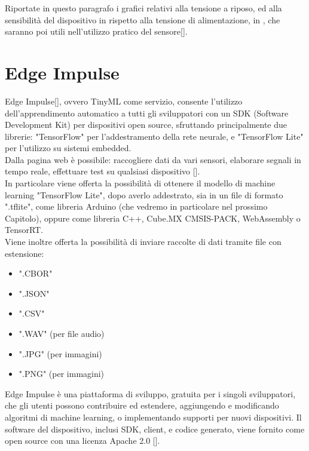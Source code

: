 Riportate in questo paragrafo i grafici relativi alla tensione a riposo, ed alla sensibilità del dispositivo in rispetto alla tensione di alimentazione, in , che saranno poi utili nell'utilizzo pratico del sensore[].

\newpage{}

\section{Edge Impulse}\label{sezione 1-4}
Edge Impulse[], ovvero TinyML come servizio, consente l'utilizzo dell'apprendimento automatico a tutti gli sviluppatori con un SDK (Software Development Kit) per dispositivi open source, sfruttando principalmente due librerie: "TensorFlow" per l'addestramento della rete neurale, e "TensorFlow Lite" per l'utilizzo su sistemi embedded.\\

Dalla pagina web è possibile: raccogliere dati da vari sensori, elaborare segnali in tempo reale, effettuare test su qualsiasi dispositivo [].\\
In particolare viene offerta la possibilità di ottenere il modello di machine learning "TensorFlow Lite", dopo averlo addestrato, sia in un file di formato ".tflite", come libreria Arduino (che vedremo in particolare nel prossimo Capitolo), oppure come libreria C++, Cube.MX CMSIS-PACK, WebAssembly o TensorRT.\\

Viene inoltre offerta la possibilità di inviare raccolte di dati tramite file con estensione:
\begin{itemize}[noitemsep]
    \item{".CBOR"}
    \item{".JSON"}
    \item{".CSV"}
    \item{".WAV" (per file audio)}
    \item{".JPG" (per immagini)}
    \item{".PNG" (per immagini)}\\
\end{itemize}

Edge Impulse è una piattaforma di sviluppo, gratuita per i singoli sviluppatori, che gli utenti possono contribuire ed estendere, aggiungendo e modificando algoritmi di machine learning, o implementando supporti per nuovi dispositivi. Il software del dispositivo, inclusi SDK, client, e codice generato, viene fornito come open source con una licenza Apache 2.0 [].\\

